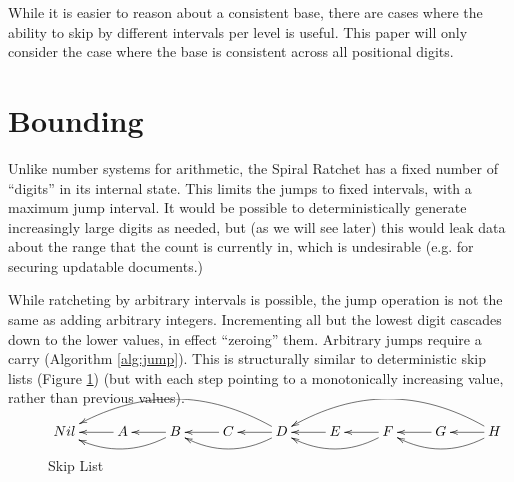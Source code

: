 \documentclass{article}
\begin{document}
	While it is easier to reason about a consistent base, there are cases where the ability to skip by different intervals per level is useful. This paper will only consider the case where the base is consistent across all positional digits.
    
    \section{Bounding}
    
    Unlike number systems for arithmetic, the Spiral Ratchet has a fixed number of ``digits'' in its internal state. This limits the jumps to fixed intervals, with a maximum jump interval.  It would be possible to deterministically generate increasingly large digits as needed, but (as we will see later) this would leak data about the range that the count is currently in, which is undesirable (e.g. for securing updatable documents.)
    
    While ratcheting by arbitrary intervals is possible, the jump operation is not the same as adding arbitrary integers. Incrementing all but the lowest digit cascades down to the lower values, in effect ``zeroing'' them. Arbitrary jumps require a carry (Algorithm \ref{alg:jump}). This is structurally similar to deterministic skip lists\cite{deterministic-skip-lists} (Figure \ref{fig:skip-list}) (but with each step pointing to a monotonically increasing value, rather than previous values). \\
 
	\begin{figure}[h]
		\centering
		
		$\xymatrix{
			  Nil
			& A \ar[l]
			& B \ar[l] , \ar@/^1pc/[ll]
			& C \ar[l]
			& D \ar[l] , \ar@/^1pc/[ll] , \ar@/_2pc/[llll]
			& E \ar[l]
			& F \ar[l] , \ar@/^1pc/[ll]
			& G \ar[l]
			& H \ar[l] , \ar@/^1pc/[ll] , \ar@/_2pc/[llll]
		}$
	
		\caption{Skip List}
		\label{fig:skip-list}
	\end{figure}
\end{document}
